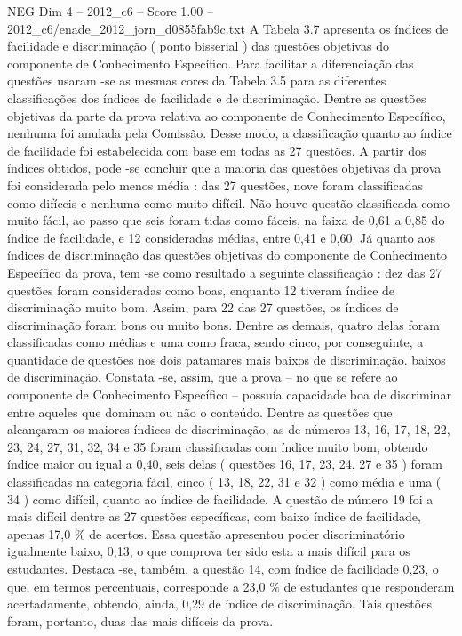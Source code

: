\begin{textsample}{NEG Dim 4 – 2012\_c6 – Score 1.00 – 2012\_c6/enade\_2012\_jorn\_d0855fab9c.txt}
A Tabela 3.7 apresenta os índices de facilidade e discriminação ( ponto bisserial ) das questões objetivas do componente de Conhecimento Específico.
Para facilitar a diferenciação das questões usaram -se as mesmas cores da Tabela 3.5 para as diferentes classificações dos índices de facilidade e de discriminação.
Dentre as questões objetivas da parte da prova relativa ao componente de Conhecimento Específico, nenhuma foi anulada pela Comissão.
Desse modo, a classificação quanto ao índice de facilidade foi estabelecida com base em todas as 27 questões.
A partir dos índices obtidos, pode -se concluir que a maioria das questões objetivas da prova foi considerada pelo menos média : das 27 questões, nove foram classificadas como difíceis e nenhuma como muito difícil.
Não houve questão classificada como muito fácil, ao passo que seis foram tidas como fáceis, na faixa de 0,61 a 0,85 do índice de facilidade, e 12 consideradas médias, entre 0,41 e 0,60.
Já quanto aos índices de discriminação das questões objetivas do componente de Conhecimento Específico da prova, tem -se como resultado a seguinte classificação : dez das 27 questões foram consideradas como boas, enquanto 12 tiveram índice de discriminação muito bom.
Assim, para 22 das 27 questões, os índices de discriminação foram bons ou muito bons.
Dentre as demais, quatro delas foram classificadas como médias e uma como fraca, sendo cinco, por conseguinte, a quantidade de questões nos dois patamares mais baixos de discriminação. baixos de discriminação.
Constata -se, assim, que a prova – no que se refere ao componente de Conhecimento Específico – possuía capacidade boa de discriminar entre aqueles que dominam ou não o conteúdo.
Dentre as questões que alcançaram os maiores índices de discriminação, as de números 13, 16, 17, 18, 22, 23, 24, 27, 31, 32, 34 e 35 foram classificadas com índice muito bom, obtendo índice maior ou igual a 0,40, seis delas ( questões 16, 17, 23, 24, 27 e 35 ) foram classificadas na categoria fácil, cinco ( 13, 18, 22, 31 e 32 ) como média e uma ( 34 ) como difícil, quanto ao índice de facilidade.
A questão de número 19 foi a mais difícil dentre as 27 questões específicas, com baixo índice de facilidade, apenas 17,0 \% de acertos.
Essa questão apresentou poder discriminatório igualmente baixo, 0,13, o que comprova ter sido esta a mais difícil para os estudantes.
Destaca -se, também, a questão 14, com índice de facilidade 0,23, o que, em termos percentuais, corresponde a 23,0 \% de estudantes que responderam acertadamente, obtendo, ainda, 0,29 de índice de discriminação.
Tais questões foram, portanto, duas das mais difíceis da prova.

\end{textsample}
